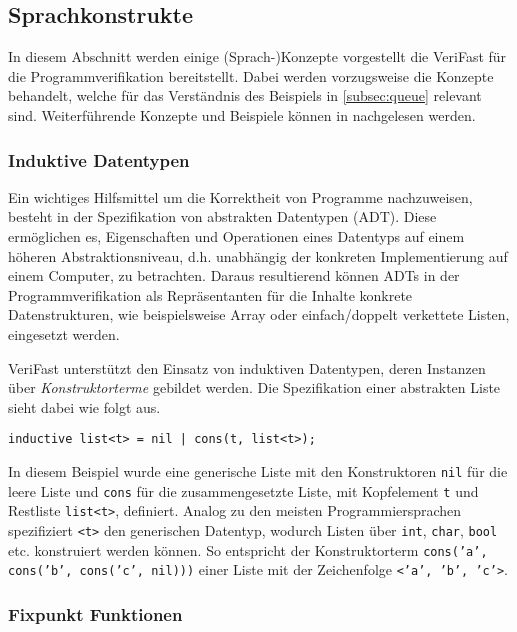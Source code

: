\subsection{Sprachkonstrukte}

In diesem Abschnitt werden einige (Sprach-)Konzepte vorgestellt die VeriFast für die Programmverifikation bereitstellt. Dabei werden vorzugsweise die Konzepte behandelt, welche für das Verständnis des Beispiels in \cref{subsec:queue} relevant sind. Weiterführende Konzepte und Beispiele können in \cite{Jacobs2017} nachgelesen werden.

\subsubsection{Induktive Datentypen}
\label{subsubsec:adt}

Ein wichtiges Hilfsmittel um die Korrektheit von Programme nachzuweisen, besteht in der Spezifikation von abstrakten Datentypen (ADT). Diese ermöglichen es, Eigenschaften und Operationen eines Datentyps auf einem höheren Abstraktionsniveau, d.h. unabhängig der konkreten Implementierung auf einem Computer, zu betrachten. Daraus resultierend können ADTs in der Programmverifikation als Repräsentanten für die Inhalte konkrete Datenstrukturen, wie beispielsweise Array oder einfach/doppelt verkettete Listen, eingesetzt werden. \cite[S. 265]{Saake2014}

VeriFast unterstützt den Einsatz von induktiven Datentypen, deren Instanzen über \emph{Konstruktorterme} gebildet werden. Die Spezifikation einer abstrakten Liste sieht dabei wie folgt aus.

\begin{lstlisting}
inductive list<t> = nil | cons(t, list<t>);
\end{lstlisting}

\noindent
In diesem Beispiel wurde eine generische Liste mit den Konstruktoren \texttt{nil} für die leere Liste und \texttt{cons} für die zusammengesetzte Liste, mit Kopfelement \texttt{t} und Restliste \texttt{list<t>}, definiert. Analog zu den meisten Programmiersprachen spezifiziert \texttt{<t>} den generischen Datentyp, wodurch Listen über \texttt{int}, \texttt{char}, \texttt{bool} etc. konstruiert werden können. So entspricht der Konstruktorterm \texttt{cons('a', cons('b', cons('c', nil)))} einer Liste mit der Zeichenfolge \texttt{<'a', 'b', 'c'>}.

\subsubsection{Fixpunkt Funktionen}

